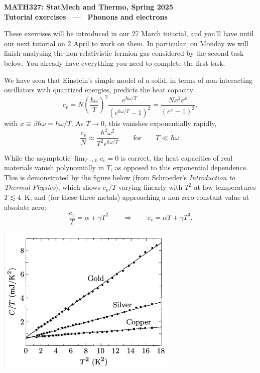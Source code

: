 \documentclass[12 pt]{article} %
\newcommand{\al}{\ensuremath{\alpha} }
\newcommand{\be}{\ensuremath{\beta} }
\newcommand{\ga}{\ensuremath{\gamma} }
\newcommand{\om}{\ensuremath{\omega} }
\newcommand{\Lra}{\ensuremath{\Longrightarrow} }
\begin{document}
\newcommand{\thisunit}{MATH327 Tutorial (Phonons)}
\newcommand{\moddate}{Last modified 27 Mar.~2025}
\begin{center}
  {\Large \textbf{MATH327: StatMech and Thermo, Spring 2025}} \\[12 pt]
  {\Large \textbf{Tutorial exercises \ --- \ Phonons and electrons}} \\[24 pt]
\end{center}

These exercises will be introduced in our 27 March tutorial, and you'll have until our next tutorial on 2 April to work on them.
In particular, on Monday we will finish analysing the non-relativistic fermion gas considered by the second task below.
You already have everything you need to complete the first task.

We have seen that Einstein's simple model of a solid, in terms of non-interacting oscillators with quantized energies, predicts the heat capacity
\begin{equation*}
  c_v = N \left(\frac{\hbar \om}{T}\right)^2 \frac{e^{\hbar \om / T}}{\left(e^{\hbar \om / T} - 1\right)^2} = \frac{N x^2 e^x}{\left(e^x - 1\right)^2},
\end{equation*}
with $x \equiv \be\hbar\om = \hbar\om / T$.
As $T \to 0$, this vanishes exponentially rapidly,
\begin{equation*}
  \frac{c_v}{N} \approx \frac{\hbar^2 \om^2}{T^2 e^{\hbar \om / T}} \qquad \mbox{for} \qquad T \ll \hbar\om.
\end{equation*}

While the asymptotic $\lim_{T \to 0} c_v = 0$ is correct, the heat capacities of real materials vanish polynomially in $T$, as opposed to this exponential dependence.
This is demonstrated by the figure below (from Schroeder's \textit{Introduction to Thermal Physics}), which shows $c_v / T$ varying linearly with $T^2$ at low temperatures $T \lesssim 4$~K, and (for these three metals) approaching a non-zero constant value at absolute zero:
\begin{equation*}
  \frac{c_v}{T} = \al + \ga T^2 \qquad \Lra \qquad c_v = \al T + \ga T^3.
\end{equation*}

\vspace{-30 pt}
\begin{center}\includegraphics[width=0.65\textwidth]{figs/heat_cap-lowT.pdf}\end{center}
\vspace{-20 pt}
\end{document}
